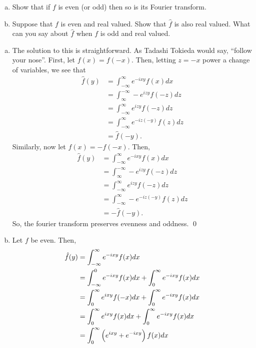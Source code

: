 \documentclass{article}
\begin{document}
\newpage
{} 
\begin{enumerate}[(a)]
    \item Show that if $f$ is even (or odd) then so is its Fourier transform.
    \item Suppose that $f$ is even and real valued. Show that $\hat{f}$ is also real valued. What can you say about
    $\hat{f}$ when $f$ is odd and real valued.
\end{enumerate}
\tri
\hop 
\solution
\begin{enumerate}[(a)]
    \item The solution to this is straightforward. As Tadashi Tokieda would say, ``follow your nose''. First, let $f(x)= f(-x)$. Then, letting $z=-x$ power a change of variables, we see that 
    \begin{align*}
        \hat{f}(y) &= \int_{-\infty}^\infty e^{-ixy}f(x)dx\\
        &=  \int_{\infty}^{-\infty} -e^{izy}f(-z)dz\\
        &=  \int_{-\infty}^{\infty} e^{izy}f(-z)dz\\
        &=  \int_{-\infty}^{\infty} e^{-iz(-y)}f(z)dz\\
        &= \hat{f}(-y).
    \end{align*}
    Similarly, now let $f(x)= -f(-x)$. Then, 
    \begin{align*}
        \hat{f}(y) &= \int_{-\infty}^\infty e^{-ixy}f(x)dx\\
        &=  \int_{\infty}^{-\infty} -e^{izy}f(-z)dz\\
        &=  \int_{-\infty}^{\infty} e^{izy}f(-z)dz\\
        &=  \int_{-\infty}^{\infty}- e^{-iz(-y)}f(z)dz\\
        &= -\hat{f}(-y).
    \end{align*}
    So, the fourier transform preserves evenness and oddness. \qed
    \item Let $f$ be even. Then, 
    \begin{align*}
        \hat{f}(y) &= \int_{-\infty}^\infty e^{-ixy}f(x)dx \\
        &= \int_{-\infty}^0 e^{-ixy}f(x)dx + \int_{0}^\infty e^{-ixy}f(x)dx\\
        &= \int_{0}^\infty e^{ixy}f(-x)dx + \int_{0}^\infty e^{-ixy}f(x)dx\\
        &= \int_{0}^\infty e^{ixy}f(x)dx + \int_{0}^\infty e^{-ixy}f(x)dx\\
        &= \int_{0}^\infty\del{ e^{ixy}+ e^{-ixy}}f(x)dx\\

\end{align*}
\end{enumerate}
\end{document}
